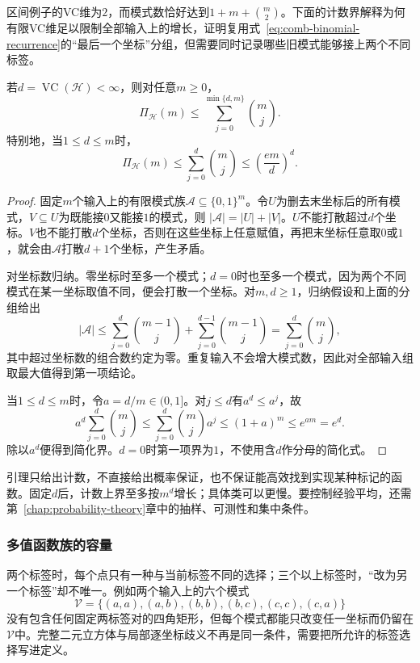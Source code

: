 区间例子的VC维为\(2\)，而模式数恰好达到\(1+m+\binom m2\)。下面的计数界解释为何有限VC维足以限制全部输入上的增长，证明复用式~\eqref{eq:comb-binomial-recurrence}的“最后一个坐标”分组，但需要同时记录哪些旧模式能够接上两个不同标签。
\begin{lemma}
  \label{lem:sauer-shelah}
  若\(d=\operatorname{VC}(\mathcal H)<\infty\)，则对任意\(m\geq0\)，
  \[
    \Pi_{\mathcal H}(m)\leq\sum_{j=0}^{\min\{d,m\}}\binom mj.
  \]
  特别地，当\(1\leq d\leq m\)时，
  \begin{equation}
    \Pi_{\mathcal H}(m)\leq\sum_{j=0}^{d}\binom mj
    \leq\left(\frac{em}{d}\right)^d.
    \label{eq:sauer-shelah}
  \end{equation}
\end{lemma}
\begin{proof}
固定\(m\)个输入上的有限模式族\(\mathcal A\subseteq\{0,1\}^m\)。令\(U\)为删去末坐标后的所有模式，\(V\subseteq U\)为既能接\(0\)又能接\(1\)的模式，则
\( |\mathcal A|=|U|+|V|\)。\(U\)不能打散超过\(d\)个坐标。\(V\)也不能打散\(d\)个坐标，否则在这些坐标上任意赋值，再把末坐标任意取\(0\)或\(1\)，就会由\(\mathcal A\)打散\(d+1\)个坐标，产生矛盾。

对坐标数归纳。零坐标时至多一个模式；\(d=0\)时也至多一个模式，因为两个不同模式在某一坐标取值不同，便会打散一个坐标。对\(m,d\geq1\)，归纳假设和上面的分组给出
\[
  |\mathcal A|
  \leq\sum_{j=0}^{d}\binom{m-1}{j}
       +\sum_{j=0}^{d-1}\binom{m-1}{j}
  =\sum_{j=0}^{d}\binom mj,
\]
其中超过坐标数的组合数约定为零。重复输入不会增大模式数，因此对全部输入组取最大值得到第一项结论。

当\(1\leq d\leq m\)时，令\(a=d/m\in(0,1]\)。对\(j\leq d\)有\(a^d\leq a^j\)，故
\[
  a^d\sum_{j=0}^{d}\binom mj
  \leq\sum_{j=0}^{d}\binom mj a^j
  \leq(1+a)^m\leq e^{am}=e^d.
\]
除以\(a^d\)便得到简化界。\(d=0\)时第一项界为\(1\)，不使用含\(d\)作分母的简化式。
\end{proof}
引理只给出计数，不直接给出概率保证，也不保证能高效找到实现某种标记的函数。固定\(d\)后，计数上界至多按\(m^d\)增长；具体类可以更慢。要控制经验平均，还需第~\ref{chap:probability-theory}章中的抽样、可测性和集中条件。

\subsubsection{多值函数族的容量}
\label{sec:comb-multiclass-dimensions}

两个标签时，每个点只有一种与当前标签不同的选择；三个以上标签时，“改为另一个标签”却不唯一。例如两个输入上的六个模式
\[
  \mathcal V=\{(a,a),(a,b),(b,b),(b,c),(c,c),(c,a)\}
\]
没有包含任何固定两标签对的四角矩形，但每个模式都能只改变任一坐标而仍留在\(\mathcal V\)中。完整二元立方体与局部逐坐标歧义不再是同一条件，需要把所允许的标签选择写进定义。

